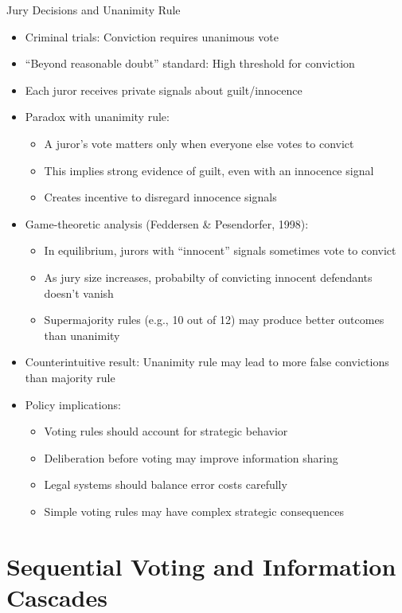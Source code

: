 \documentclass[10pt]{beamer}
\begin{document}
\begin{frame}{Jury Decisions and Unanimity Rule}
  \begin{itemize}[<+->]
    \item Criminal trials: Conviction requires unanimous vote
    \item ``Beyond reasonable doubt'' standard: High threshold for conviction
    \item Each juror receives private signals about guilt/innocence
    \item Paradox with unanimity rule:
      \begin{itemize}
        \item A juror's vote matters only when everyone else votes to convict
        \item This implies strong evidence of guilt, even with an innocence signal
        \item Creates incentive to disregard innocence signals
      \end{itemize}
    \item Game-theoretic analysis (Feddersen \& Pesendorfer, 1998):
      \begin{itemize}
        \item In equilibrium, jurors with ``innocent'' signals sometimes vote to convict
        \item As jury size increases, probabilty of convicting innocent defendants doesn't vanish
        \item Supermajority rules (e.g., 10 out of 12) may produce better outcomes than unanimity
      \end{itemize}
    \item Counterintuitive result: Unanimity rule may lead to more false convictions than majority rule
    \item Policy implications:
      \begin{itemize}
        \item Voting rules should account for strategic behavior
        \item Deliberation before voting may improve information sharing
        \item Legal systems should balance error costs carefully
        \item Simple voting rules may have complex strategic consequences
      \end{itemize}
  \end{itemize}
\end{frame}

\section{Sequential Voting and Information Cascades}
\end{document}
